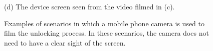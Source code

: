 \begin{figure}[!t]
{\begin{minipage}[t]{3.5cm}
             \footnotesize (d) The device screen seen from the video filmed in (c).
            \end{minipage}
        }
        \hspace{0.5cm}
        \caption{Examples of scenarios in which a mobile phone camera is used to film the unlocking process.
        In these scenarios, the camera does not need to have a clear sight of the screen.}
        \label{fig:fig1}
    \end{figure}


